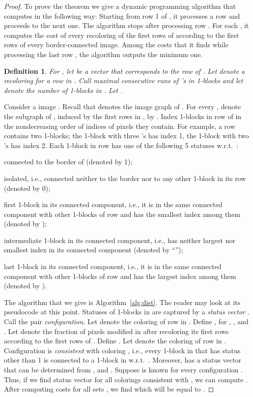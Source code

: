 \documentclass[11pt,english]{article}
\renewenvironment{itemize}[1]{\begin{compactitem}#1}{\end{compactitem}}
\newtheorem{definition}{Definition}[section]
\numberwithin{figure}{section}
\begin{document}
\begin{proof}
To prove the theorem we give a dynamic programming algorithm that computes  in the following way: Starting from row 1 of , it processes a row and proceeds to the next one. The algorithm stops after processing row . For each , it computes the cost of every recoloring of the first  rows of  according to the first  rows of every  border-connected image. Among the costs that it finds while processing the last row , the algorithm outputs the minimum one.

\begin{definition}
\label{def:block}
For , let  be a vector that corresponds to the  row of . Let  denote a recoloring for a row in . Call maximal consecutive runs of 's in  {\em 1-blocks} and let  denote the number of 1-blocks in . Let .
\end{definition}

Consider a  image . Recall that  denotes the image graph of . For every , denote the subgraph of , induced by the first  rows in , by . Index 1-blocks in row  of  in the nondecreasing order of indices of pixels they contain. For example, a row  contains two 1-blocks; the 1-block with three 's  has index 1, the 1-block with two 's has index 2. Each 1-block in row  has one of the following 5 statuses w.r.t.\ :
\begin{itemize}
\item{connected to the border of  (denoted by 1);}
\item{isolated, i.e., connected neither to the border nor to any other 1-block in its row (denoted by 0);}
\item{first 1-block in its connected component, i.e., it is in the same connected component with other 1-blocks of row  and has the smallest index among them (denoted by );}
\item{intermediate 1-block in its connected component, i.e., has neither largest nor smallest index in its connected component (denoted by ``'');}
\item{last 1-block in its connected component, i.e., it is in the same connected component with other 1-blocks of row  and has the largest index among them (denoted by ).}
\end{itemize}

The algorithm that we give is Algorithm~\ref{alg:dist}. The reader may look at its pseudocode at this point. Statuses of 1-blocks in  are captured by a {\em status vector} . Call the pair  {\em configuration}. Let  denote the coloring of row  in . Define , for , , and . Let  denote the fraction of pixels modified in  after recoloring its first  rows according to the first  rows of . Define . Let  denote the coloring of row  in . Configuration  is {\em consistent} with coloring , i.e., every 1-block in  that has status other than 1 is connected to a 1-block in  w.r.t.\ . Moreover,  has a status vector  that can be determined from , and . Suppose  is known for every configuration . Thus, if we find status vector  for all colorings  consistent with , we can compute . After computing costs for all sets , we find  which will be equal to .


\end{proof}
\end{document}
